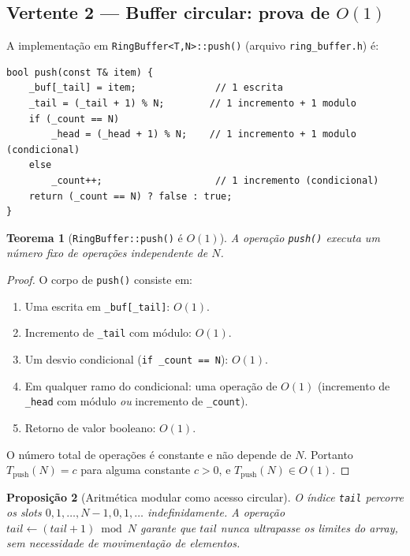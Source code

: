 \documentclass[12pt, a4paper]{article}
\newtheorem{teorema}{Teorema}
\newtheorem{proposicao}[teorema]{Proposição}
\theoremstyle{definition}
\theoremstyle{remark}
\begin{document}
\subsection{Vertente 2 — Buffer circular: prova de \texorpdfstring{$O(1)$}{O(1)}}

A implementação em \texttt{RingBuffer<T,N>::push()} (arquivo
\texttt{ring\_buffer.h}) é:

\begin{lstlisting}[caption={Núcleo de \texttt{RingBuffer::push()} — O(1)}]
bool push(const T& item) {
    _buf[_tail] = item;              // 1 escrita
    _tail = (_tail + 1) % N;        // 1 incremento + 1 modulo
    if (_count == N)
        _head = (_head + 1) % N;    // 1 incremento + 1 modulo (condicional)
    else
        _count++;                    // 1 incremento (condicional)
    return (_count == N) ? false : true;
}
\end{lstlisting}

\begin{teorema}[\texttt{RingBuffer::push()} é $O(1)$]
\label{thm:ring-push}
A operação \texttt{push()} executa um número fixo de operações
independente de $N$.
\end{teorema}

\begin{proof}
O corpo de \texttt{push()} consiste em:
\begin{enumerate}[label=(\roman*)]
  \item Uma escrita em \texttt{\_buf[\_tail]}: $O(1)$.
  \item Incremento de \texttt{\_tail} com módulo: $O(1)$.
  \item Um desvio condicional (\texttt{if \_count == N}): $O(1)$.
  \item Em qualquer ramo do condicional: uma operação de $O(1)$
        (incremento de \texttt{\_head} com módulo \emph{ou} incremento de
        \texttt{\_count}).
  \item Retorno de valor booleano: $O(1)$.
\end{enumerate}
O número total de operações é constante e não depende de $N$.
Portanto $T_{\text{push}}(N) = c$ para alguma constante $c > 0$, e
$T_{\text{push}}(N) \in O(1)$.
\end{proof}

\begin{proposicao}[Aritmética modular como acesso circular]
O índice \texttt{tail} percorre os slots $0, 1, \ldots, N-1, 0, 1, \ldots$
indefinidamente. A operação $\mathit{tail} \leftarrow (\mathit{tail}+1) \bmod N$
garante que $\mathit{tail}$ nunca ultrapasse os limites do array, sem
necessidade de movimentação de elementos.
\end{proposicao}
\end{document}
